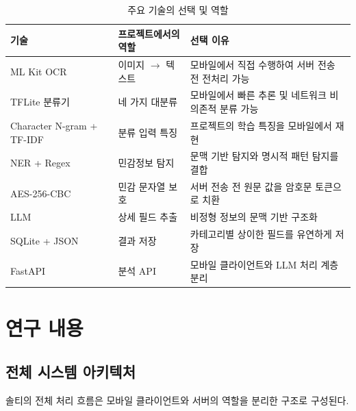\documentclass[11pt,a4paper]{article}
\begin{document}
\begin{table}[H]
\centering
\small
\begin{tabularx}{\linewidth}{p{3.0cm}Y Y}
\toprule
\textbf{기술} & \textbf{프로젝트에서의 역할} & \textbf{선택 이유}\\
\midrule
ML Kit OCR & 이미지 $\rightarrow$ 텍스트 & 모바일에서 직접 수행하여 서버 전송 전 전처리 가능\\
TFLite 분류기 & 네 가지 대분류 & 모바일에서 빠른 추론 및 네트워크 비의존적 분류 가능\\
Character N-gram + TF-IDF & 분류 입력 특징 & 프로젝트의 학습 특징을 모바일에서 재현\\
NER + Regex & 민감정보 탐지 & 문맥 기반 탐지와 명시적 패턴 탐지를 결합\\
AES-256-CBC & 민감 문자열 보호 & 서버 전송 전 원문 값을 암호문 토큰으로 치환\\
LLM & 상세 필드 추출 & 비정형 정보의 문맥 기반 구조화\\
SQLite + JSON & 결과 저장 & 카테고리별 상이한 필드를 유연하게 저장\\
FastAPI & 분석 API & 모바일 클라이언트와 LLM 처리 계층 분리\\
\bottomrule
\end{tabularx}
\caption{주요 기술의 선택 및 역할}
\end{table}

\newpage

\section{연구 내용}

\subsection{전체 시스템 아키텍처}

솔티의 전체 처리 흐름은 모바일 클라이언트와 서버의 역할을 분리한 구조로 구성된다.
\end{document}
